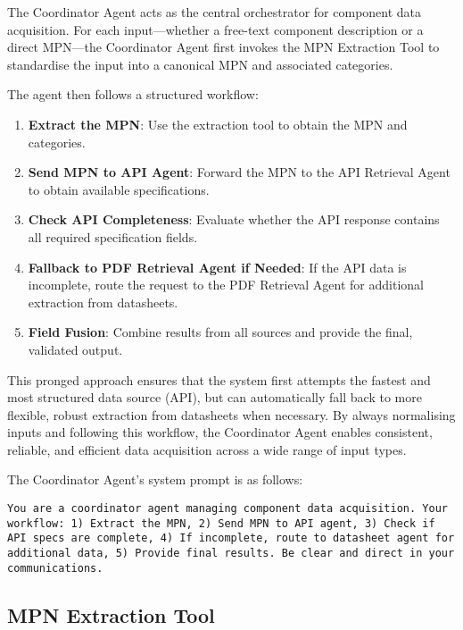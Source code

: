 The Coordinator Agent acts as the central orchestrator for component data acquisition. For each input—whether a free-text component description or a direct MPN—the Coordinator Agent first invokes the MPN Extraction Tool to standardise the input into a canonical MPN and associated categories. 

The agent then follows a structured workflow:
\begin{enumerate}
    \item \textbf{Extract the MPN}: Use the extraction tool to obtain the MPN and categories.
    \item \textbf{Send MPN to API Agent}: Forward the MPN to the API Retrieval Agent to obtain available specifications.
    \item \textbf{Check API Completeness}: Evaluate whether the API response contains all required specification fields.
    \item \textbf{Fallback to PDF Retrieval Agent if Needed}: If the API data is incomplete, route the request to the PDF Retrieval Agent for additional extraction from datasheets.
    \item \textbf{Field Fusion}: Combine results from all sources and provide the final, validated output.
\end{enumerate}

This pronged approach ensures that the system first attempts the fastest and most structured data source (API), but can automatically fall back to more flexible, robust extraction from datasheets when necessary. By always normalising inputs and following this workflow, the Coordinator Agent enables consistent, reliable, and efficient data acquisition across a wide range of input types.

The Coordinator Agent's system prompt is as follows:
\begin{lstlisting}[caption={System prompt for the Coordinator Agent.}, label={lst:coordinator_prompt}, breaklines=true]
You are a coordinator agent managing component data acquisition. Your workflow: 1) Extract the MPN, 2) Send MPN to API agent, 3) Check if API specs are complete, 4) If incomplete, route to datasheet agent for additional data, 5) Provide final results. Be clear and direct in your communications.
\end{lstlisting}

\subsection{MPN Extraction Tool}

